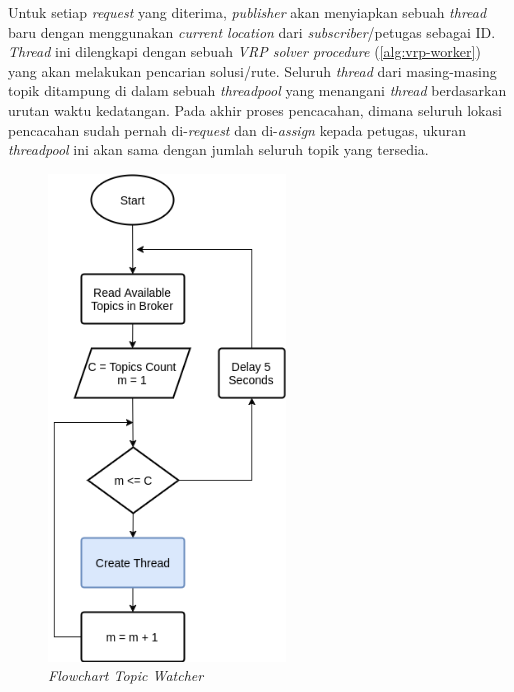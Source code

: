 Untuk setiap \textit{request} yang diterima, \textit{publisher} akan menyiapkan sebuah \textit{thread} baru dengan menggunakan \textit{current location} dari \textit{subscriber}/petugas sebagai ID. \textit{Thread} ini dilengkapi dengan sebuah \textit{VRP solver procedure} (\autoref{alg:vrp-worker}) yang akan melakukan pencarian solusi/rute. Seluruh \textit{thread} dari masing-masing topik ditampung di dalam sebuah \textit{threadpool} yang menangani \textit{thread} berdasarkan urutan waktu kedatangan. Pada akhir proses pencacahan, dimana seluruh lokasi pencacahan sudah pernah di-\textit{request} dan di-\textit{assign} kepada petugas, ukuran \textit{threadpool} ini akan sama dengan jumlah seluruh topik yang tersedia. 


\begin{figure}[!]
	\centering
	\includegraphics[width=6.3cm]{Resources/Images/topic-watcher}
	\caption{\textit{\textit{Flowchart} Topic Watcher}}
	\label{fig:topic-watcher}
\end{figure}


